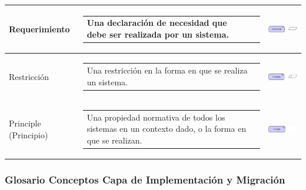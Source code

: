 \begin{longtable}[c]{|p{2.5cm}|l|c|}
	Requerimiento				& \begin{tabular}[c]{p{7cm}@{}l@{}}Una declaración de necesidad que debe ser realizada por un sistema.\end{tabular} & \includegraphics[width=35mm]{arquitectura/adm_lenguaje/imgs/motivational/Requirement}          \\ \hline
	Restricción					& \begin{tabular}[c]{p{7cm}@{}l@{}}Una restricción en la forma en que se realiza un sistema.\end{tabular} & \includegraphics[width=35mm]{arquitectura/adm_lenguaje/imgs/motivational/Constraint}          \\ \hline
	Principle (Principio)	   	& \begin{tabular}[c]{p{7cm}@{}l@{}}Una propiedad normativa de todos los sistemas en un contexto dado, o la forma en que se realizan.\end{tabular} & \includegraphics[width=35mm]{arquitectura/adm_lenguaje/imgs/motivational/Principle}          \\ \hline
\end{longtable}



\newpage

\subsubsection{Glosario Conceptos Capa de Implementación y Migración}

